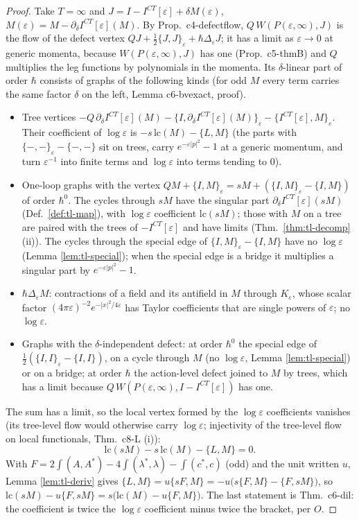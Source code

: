 \documentclass[11pt]{article}
\numberwithin{equation}{section}
\theoremstyle{plain}
\theoremstyle{definition}
\begin{document}
\begin{proof}
Take $T=\infty$ and $J=I-I^{CT}[\varepsilon]+\delta M(\varepsilon)$, $M(\varepsilon)=M-\partial_\delta I^{CT}[\varepsilon](M)$. By Prop.~c4-defectflow, $Q\,W(P(\varepsilon,\infty),J)$ is the flow of the defect vertex $QJ+\tfrac12\{J,J\}_\varepsilon+\hbar\Delta_\varepsilon J$; it has a limit as $\varepsilon\to0$ at generic momenta, because $W(P(\varepsilon,\infty),J)$ has one (Prop.~c5-thmB) and $Q$ multiplies the leg functions by polynomials in the momenta. Its $\delta$-linear part of order $\hbar$ consists of graphs of the following kinds (for odd $M$ every term carries the same factor $\delta$ on the left, Lemma c6-bvexact, proof).
\begin{itemize}
\item Tree vertices $-Q\,\partial_\delta I^{CT}[\varepsilon](M)-\{I,\partial_\delta I^{CT}[\varepsilon](M)\}_\varepsilon-\{I^{CT}[\varepsilon],M\}_\varepsilon$. Their coefficient of $\log\varepsilon$ is $-s\,\mathrm{lc}(M)-\{L,M\}$ (the parts with $\{-,-\}_\varepsilon-\{-,-\}$ sit on trees, carry $e^{-\varepsilon|p|^2}-1$ at a generic momentum, and turn $\varepsilon^{-1}$ into finite terms and $\log\varepsilon$ into terms tending to $0$).
\item One-loop graphs with the vertex $QM+\{I,M\}_\varepsilon=sM+(\{I,M\}_\varepsilon-\{I,M\})$ of order $\hbar^0$. The cycles through $sM$ have the singular part $\partial_\delta I^{CT}[\varepsilon](sM)$ (Def.~\ref{def:tl-map}), with $\log\varepsilon$ coefficient $\mathrm{lc}(sM)$; those with $M$ on a tree are paired with the trees of $-I^{CT}[\varepsilon]$ and have limits (Thm.~\ref{thm:tl-decomp} (ii)). The cycles through the special edge of $\{I,M\}_\varepsilon-\{I,M\}$ have no $\log\varepsilon$ (Lemma \ref{lem:tl-special}); when the special edge is a bridge it multiplies a singular part by $e^{-\varepsilon|p|^2}-1$.
\item $\hbar\Delta_\varepsilon M$: contractions of a field and its antifield in $M$ through $K_\varepsilon$, whose scalar factor $(4\pi\varepsilon)^{-2}e^{-|x|^2/4\varepsilon}$ has Taylor coefficients that are single powers of $\varepsilon$; no $\log\varepsilon$.
\item Graphs with the $\delta$-independent defect: at order $\hbar^0$ the special edge of $\tfrac12(\{I,I\}_\varepsilon-\{I,I\})$, on a cycle through $M$ (no $\log\varepsilon$, Lemma \ref{lem:tl-special}) or on a bridge; at order $\hbar$ the action-level defect joined to $M$ by trees, which has a limit because $Q\,W(P(\varepsilon,\infty),I-I^{CT}[\varepsilon])$ has one.
\end{itemize}
The sum has a limit, so the local vertex formed by the $\log\varepsilon$ coefficients vanishes (its tree-level flow would otherwise carry $\log\varepsilon$; injectivity of the tree-level flow on local functionals, Thm.~c8-L (i)):
\[
\mathrm{lc}(sM)-s\,\mathrm{lc}(M)-\{L,M\}=0 .
\]
With $F=2\int(A,A^*)-4\int(\lambda^*,\lambda)-\int(c^*,c)$ (odd) and the unit written $u$, Lemma \ref{lem:tl-deriv} gives $\{L,M\}=u\{sF,M\}=-u\big(s\{F,M\}-\{F,sM\}\big)$, so $\mathrm{lc}(sM)-u\{F,sM\}=s\big(\mathrm{lc}(M)-u\{F,M\}\big)$. The last statement is Thm.~c6-dil: the coefficient is twice the $\log\varepsilon$ coefficient minus twice the bracket, per $O$.


\end{proof}
\end{document}
